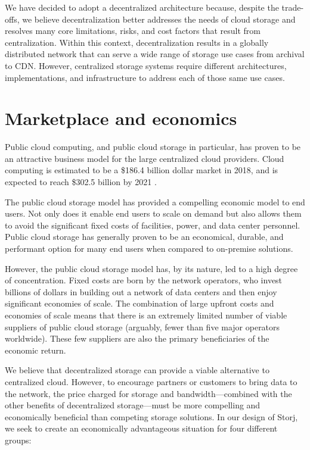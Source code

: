 \documentclass[8pt,fleqn,openany]{book}
\begin{document}
We have decided to adopt a decentralized architecture because, despite the trade-offs, we believe decentralization better addresses the needs of cloud storage
and resolves many core limitations, risks, and cost factors that result from
centralization. Within this context,
decentralization results in a globally distributed network that can
serve a wide range of storage use cases from archival to CDN. However,
centralized storage systems require different architectures, implementations,
and infrastructure to address each of those same use cases.

\section{Marketplace and economics}

Public cloud computing, and public cloud storage in particular, has
proven to be an attractive business model for the large centralized cloud
providers. Cloud computing is estimated to be a \$186.4 billion dollar market
in 2018, and is expected to reach \$302.5 billion by 2021 \cite{gartner-cloud-growth}.

The public cloud storage model has provided a compelling economic model to end
users. Not only does it enable end users to scale on demand but also allows them to avoid the significant fixed costs of facilities, power, and data center
personnel. Public cloud storage has generally proven to be an economical,
durable, and performant option for many end users when compared to
on-premise solutions.

However, the public cloud storage model has, by its nature, led to a high
degree of concentration. Fixed costs are born by the network operators, who
invest billions of dollars in building out a network of data centers and
then enjoy significant economies of scale. The combination of large upfront
costs and economies of scale means that there is an extremely limited number
of viable suppliers of public cloud storage (arguably, fewer than five major
operators worldwide). These few suppliers are also the primary beneficiaries of
the economic return.

We believe that decentralized storage can provide a viable alternative to
centralized cloud.
However, to encourage partners or customers to bring data to the network,
the price charged for storage and bandwidth---combined with the other
benefits of decentralized storage---must be
more compelling and economically beneficial than competing storage solutions.
In our design of Storj, we seek to create an economically advantageous
situation for four different groups:
\end{document}
